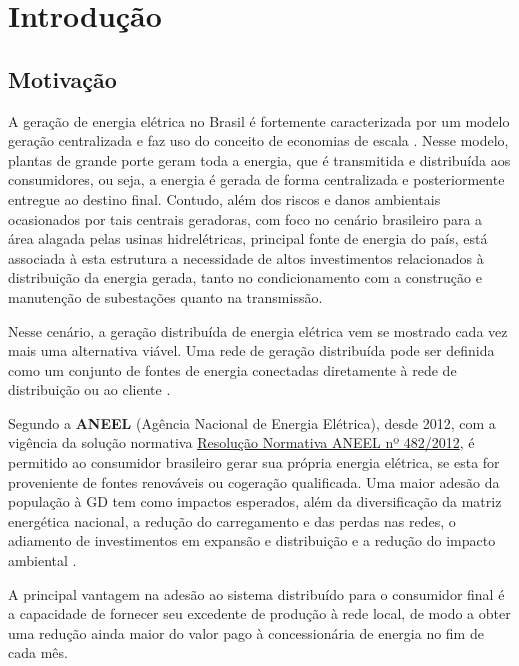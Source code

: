 \documentclass[
	12pt,				%
	openright,			%
	onseside,
	a4paper,			%
	english,			%
	french,				%
	spanish,			%
	brazil,				%
	]{abntex2}
\begin{document}
\chapter{Introdução}

\section{Motivação}

	A geração de energia elétrica no Brasil é fortemente caracterizada por um modelo geração centralizada e faz uso 
	do conceito de economias de escala \cite{MACHADO2016290}.
	Nesse modelo, plantas de grande porte geram toda a energia, que é transmitida e distribuída aos
	consumidores, ou seja, a energia é gerada de forma centralizada e posteriormente entregue ao destino final.
	Contudo, além dos riscos e danos ambientais ocasionados por tais centrais geradoras, com foco no cenário 
	brasileiro para a área alagada pelas usinas hidrelétricas, principal fonte de energia do país, 
	está associada à esta estrutura a necessidade de altos investimentos relacionados à distribuição da energia 
	gerada, tanto no condicionamento com a construção e manutenção de subestações quanto na transmissão.

	Nesse cenário, a geração distribuída de energia elétrica vem se mostrado cada vez mais uma alternativa viável.
	Uma rede de geração distribuída pode ser definida como um conjunto de fontes de energia conectadas diretamente 
	à rede de distribuição ou ao cliente \cite{ACKERMANN2001195}.

	Segundo a \textbf{ANEEL} (Agência Nacional de Energia Elétrica), desde 2012, com a vigência da solução normativa
	\href{http://www2.aneel.gov.br/cedoc/ren2012482.pdf}{Resolução Normativa ANEEL nº 482/2012}, é permitido ao 
	consumidor brasileiro gerar sua própria energia elétrica, se esta for proveniente de fontes renováveis ou cogeração qualificada.
	Uma maior adesão da população à GD tem como impactos esperados, além da diversificação da matriz energética nacional, 
	a redução do carregamento e das perdas nas redes, o adiamento de investimentos em expansão e distribuição e a redução 
	do impacto ambiental \cite{ANEEL_GD}.

	A principal vantagem na adesão ao sistema distribuído para o consumidor final é a capacidade de fornecer seu 
	excedente de produção à rede local, de modo a obter uma redução ainda maior do valor pago à concessionária de 
	energia no fim de cada mês.
\end{document}
